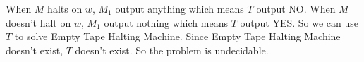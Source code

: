 \documentclass[paper=a4, fontsize=11pt]{scrartcl} %
\begin{document}
When $M$ halts on $w$, $M_1$ output anything which means $T$ output
NO. When $M$ doesn't halt on $w$, $M_1$ output nothing which means $T$
output YES. So we can use $T$ to solve Empty Tape Halting
Machine. Since Empty Tape Halting Machine doesn't exist, $T$ doesn't
exist. So the problem is undecidable.
\end{document}
